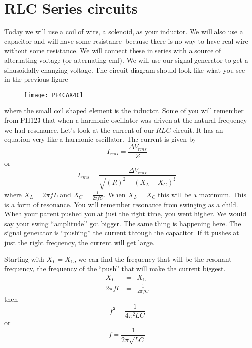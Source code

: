 \section{RLC Series circuits}

Today we will use a coil of wire, a solenoid, as your inductor. We will also use a capacitor and will have some resistance--because there is no way to have real wire without some resistance. We will connect these in series with a source of alternating voltage (or alternating emf). We will use our signal generator to get a sinusoidally changing voltage. The circuit diagram should look like what you see in the previous figure
\begin{figure}[h!]
	\centering
	\texttt{[image: PH4CAX4C]}
\end{figure}
where the small coil shaped element is the inductor. Some of you will remember from PH123 that when a harmonic oscillator was driven at the natural frequency we had resonance. Let's look at the current
of our $RLC$ circuit. It has an equation very like a harmonic oscillator. The current is given by
\begin{equation*}
	I_{rms}=\frac{\Delta V_{rms}}{Z}
\end{equation*}
or 
\begin{equation*}
	I_{rms}=\frac{\Delta V_{rms}}{\sqrt{\left( R\right) ^{2}+\left(X_{L}-X_{C}\right) ^{2}}}
\end{equation*}
where $X_{L}=2\pi fL$ and $X_{C}=\frac{1}{2\pi fC}.$ When $X_{L}=X_{C}$ this will be a maximum. This is a form of resonance. You will remember resonance from swinging as a child. When your parent pushed you at just the right time, you went higher. We would say your swing ``amplitude'' got bigger. The same thing is happening here. The signal generator is ``pushing'' the current through the capacitor. If it pushes at just the right frequency, the
current will get large.

Starting with $X_{L}=X_{C}$, we can find the frequency that will be the resonant frequency, the frequency of the ``push'' that will make the current biggest.
\begin{eqnarray*}
	  X_{L} &=&X_{C} \\
	2\pi fL &=&\frac{1}{2\pi fC}
\end{eqnarray*}
then
\begin{equation*}
	f^{2}=\frac{1}{4\pi ^{2}LC}
\end{equation*}
or
\begin{equation}
	f=\frac{1}{2\pi \sqrt{LC}}  \label{Resonance Frequecy}
\end{equation}

